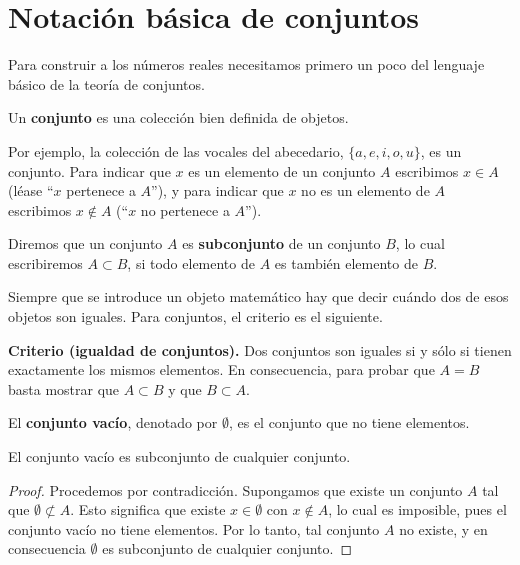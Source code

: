 \documentclass[12pt,a4paper]{book}
\begin{document}
  \section{Notación básica de conjuntos}
  
  Para construir a los números reales necesitamos primero un poco del lenguaje básico de la teoría de conjuntos.
  
  \begin{definicion}[Conjunto]
    Un \textbf{conjunto} es una colección bien definida de objetos.
  \end{definicion}
  
  Por ejemplo, la colección de las vocales del abecedario, $\{a,e,i,o,u\}$, es un conjunto. Para indicar que $x$ es un elemento de un conjunto $A$ escribimos $x \in A$ (léase ``$x$ pertenece a $A$''), y para indicar que $x$ no es un elemento de $A$ escribimos $x \notin A$ (``$x$ no pertenece a $A$'').
  
  \begin{definicion}[Subconjunto]
    Diremos que un conjunto $A$ es \textbf{subconjunto} de un conjunto $B$, lo cual escribiremos $A \subset B$, si todo elemento de $A$ es también elemento de $B$.
  \end{definicion}
  
  Siempre que se introduce un objeto matemático hay que decir cuándo dos de esos objetos son iguales. Para conjuntos, el criterio es el siguiente.
  
  \noindent\textbf{Criterio (igualdad de conjuntos).} Dos conjuntos son iguales si y sólo si tienen exactamente los mismos elementos. En consecuencia, para probar que $A=B$ basta mostrar que $A \subset B$ y que $B \subset A$.
  
  \begin{definicion}
    El \textbf{conjunto vacío}, denotado por $\emptyset$, es el conjunto que no tiene elementos.
  \end{definicion}
  
  \begin{proposicion}
    El conjunto vacío es subconjunto de cualquier conjunto.
  \end{proposicion}
  
  \begin{proof}
    Procedemos por contradicción. Supongamos que existe un conjunto $A$ tal que $\emptyset \not\subset A$. Esto significa que existe $x \in \emptyset$ con $x \notin A$, lo cual es imposible, pues el conjunto vacío no tiene elementos. Por lo tanto, tal conjunto $A$ no existe, y en consecuencia $\emptyset$ es subconjunto de cualquier conjunto.
  \end{proof}
  
\end{document}
